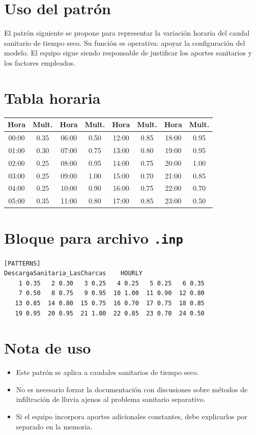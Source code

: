 \documentclass[11pt]{article}
\begin{document}

\section{Uso del patr\'on}
El patr\'on siguiente se propone para representar la variaci\'on horaria del caudal sanitario de tiempo seco. Su funci\'on es operativa: apoyar la configuraci\'on del modelo. El equipo sigue siendo responsable de justificar los aportes sanitarios y los factores empleados.

\section{Tabla horaria}
\begin{center}
\begin{tabular}{cccccccc}
\toprule
Hora & Mult. & Hora & Mult. & Hora & Mult. & Hora & Mult. \\
\midrule
00:00 & 0.35 & 06:00 & 0.50 & 12:00 & 0.85 & 18:00 & 0.95 \\
01:00 & 0.30 & 07:00 & 0.75 & 13:00 & 0.80 & 19:00 & 0.95 \\
02:00 & 0.25 & 08:00 & 0.95 & 14:00 & 0.75 & 20:00 & 1.00 \\
03:00 & 0.25 & 09:00 & 1.00 & 15:00 & 0.70 & 21:00 & 0.85 \\
04:00 & 0.25 & 10:00 & 0.90 & 16:00 & 0.75 & 22:00 & 0.70 \\
05:00 & 0.35 & 11:00 & 0.80 & 17:00 & 0.85 & 23:00 & 0.50 \\
\bottomrule
\end{tabular}
\end{center}

\section{Bloque para archivo \texttt{.inp}}
\begin{verbatim}
[PATTERNS]
DescargaSanitaria_LasCharcas    HOURLY
    1 0.35   2 0.30   3 0.25   4 0.25   5 0.25   6 0.35
    7 0.50   8 0.75   9 0.95  10 1.00  11 0.90  12 0.80
   13 0.85  14 0.80  15 0.75  16 0.70  17 0.75  18 0.85
   19 0.95  20 0.95  21 1.00  22 0.85  23 0.70  24 0.50
\end{verbatim}

\section{Nota de uso}
\begin{itemize}
\item Este patr\'on se aplica a caudales sanitarios de tiempo seco.
\item No es necesario forzar la documentaci\'on con discusiones sobre m\'etodos de infiltraci\'on de lluvia ajenos al problema sanitario separativo.
\item Si el equipo incorpora aportes adicionales constantes, debe explicarlos por separado en la memoria.
\end{itemize}
\end{document}
